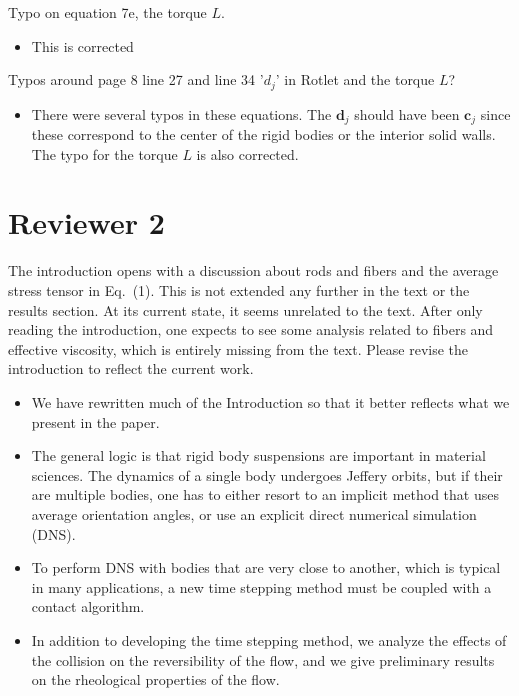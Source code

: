 \documentclass[11pt]{article}
\newcommand{\comment}[1]{{\color{blue} #1}}
\begin{document}
\noindent
\comment{Typo on equation 7e, the torque $L$.}
\begin{itemize}
  \item This is corrected
\end{itemize}

\noindent
\comment{Typos around page 8 line 27 and line 34 '$d_j$' in Rotlet and the
torque $L$?}
\begin{itemize}
  \item There were several typos in these equations.  The $\mathbf{d}_j$
    should have been $\mathbf{c}_j$ since these correspond to the center
    of the rigid bodies or the interior solid walls.  The typo for the
    torque $L$ is also corrected.
\end{itemize}


\section*{Reviewer 2}
\noindent
\comment{The introduction opens with a discussion about rods and fibers
  and the average stress tensor in Eq.~(1). This is not extended any
  further in the text or the results section. At its current state, it
  seems unrelated to the text. After only reading the introduction, one
  expects to see some analysis related to fibers and effective
viscosity, which is entirely missing from the text. Please revise the
introduction to reflect the current work.}
\begin{itemize}
  \item We have rewritten much of the Introduction so that it better
    reflects what we present in the paper.

  \item The general logic is that rigid body suspensions are important
    in material sciences.  The dynamics of a single body undergoes
    Jeffery orbits, but if their are multiple bodies, one has to either resort
    to an implicit method that uses average orientation angles, or use
    an explicit direct numerical simulation (DNS).

  \item To perform DNS with bodies that are very close to another, which
    is typical in many applications, a new time stepping method must be
    coupled with a contact algorithm.

  \item In addition to developing the time stepping method, we analyze
    the effects of the collision on the reversibility of the flow, and
    we give preliminary results on the rheological properties of the
    flow.

\end{itemize}
\end{document}
